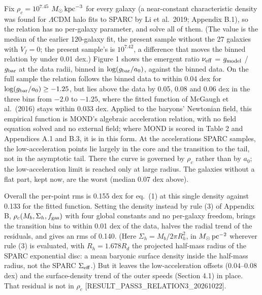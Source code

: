 \documentclass[
  10pt,
]{article}
\begin{document}
Fix $\rho_c=10^{7.45}$ $M_\odot\,{\rm kpc}^{-3}$ for every galaxy (a near-constant characteristic density was found for $\Lambda$CDM halo fits to SPARC by Li et al.~2019; Appendix B.1), so the relation has no per-galaxy parameter, and solve all of them. (The value is the median of the earlier 120-galaxy fit, the present sample without the 27 galaxies with $V_f=0$; the present sample's is $10^{7.42}$, a difference that moves the binned relation by under 0.01 dex.) Figure 1 shows the emergent ratio $\nu_{\rm eff}$ = $g_{\rm model}$ / $g_{\rm bar}$ at the data radii, binned in $\log(g_{\rm bar}/a_0)$, against the binned data. On the full sample the relation follows the binned data to within 0.04 dex for $\log(g_{\rm bar}/a_0)\ge-1.25$, but lies above the data by 0.05, 0.08 and 0.06 dex in the three bins from $-2.0$ to $-1.25$, where the fitted function of McGaugh et al.~(2016) stays within 0.033 dex. Applied to the baryons' Newtonian field, this empirical function is MOND's algebraic acceleration relation, with no field equation solved and no external field; where MOND is scored in Table 2 and Appendices A.1 and B.3, it is in this form. At the accelerations SPARC samples, the low-acceleration points lie largely in the core and the transition to the tail, not in the asymptotic tail. There the curve is governed by $\rho_c$ rather than by $a_0$; the low-acceleration limit is reached only at large radius. The galaxies without a flat part, kept now, are the worst (median 0.07 dex above).

Overall the per-point rms is 0.155 dex for eq.~(1) at this single density against 0.133 for the fitted function. Setting the density instead by rule (3) of Appendix B, $\rho_c(M_b,\Sigma_h,f_{\rm gas})$ with four global constants and no per-galaxy freedom, brings the transition bins to within 0.01 dex of the data, halves the radial trend of the residuals, and gives an rms of 0.140. (Here $\Sigma_h=M_b/2\pi R_h^2$, in $M_\odot\,{\rm pc}^{-2}$ wherever rule (3) is evaluated, with $R_h=1.678R_d$ the projected half-mass radius of the SPARC exponential disc: a mean baryonic surface density inside the half-mass radius, not the SPARC $\Sigma_{\rm eff}$.) But it leaves the low-acceleration offsets (0.04--0.08 dex) and the surface-density trend of the outer speeds (Section 4.1) in place. That residual is not in $\rho_c$ {[}RESULT\_PASS3\_RELATION3\_20261022{]}.
\end{document}
